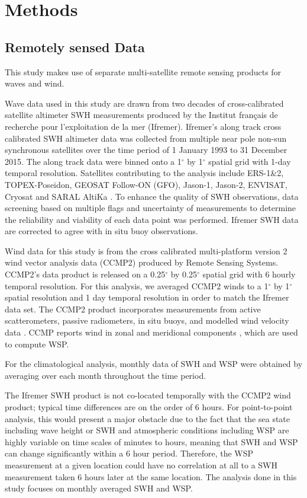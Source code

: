 \documentclass[draft,linenumbers]{agujournal2018}
\begin{document}
\section{Methods}

\subsection{Remotely sensed Data}

This study makes use of separate multi-satellite remote sensing products for waves and wind.   

Wave data used in this study are drawn from two decades of cross-calibrated satellite altimeter SWH measurements produced by the Institut fran\c{c}ais de recherche pour l'exploitation de la mer (Ifremer).  Ifremer's along track cross calibrated SWH altimeter data was collected from multiple near pole non-sun synchronous satellites over the time period of 1 January 1993 to 31 December 2015. The along track data were binned onto a 1$^{\circ}$ by 1$^{\circ}$ spatial grid with 1-day temporal resolution. Satellites contributing to the analysis include ERS-1\&2, TOPEX-Poseidon, GEOSAT Follow-ON (GFO), Jason-1, Jason-2, ENVISAT, Cryosat and SARAL AltiKa \cite{Queffeulou2017Global}. To enhance the quality of SWH observations, data screening based on multiple flags and uncertainty of measurements to determine the reliability and viability of each data point was performed. Ifremer SWH data are corrected to agree with in situ buoy observations.

Wind data for this study is from the cross calibrated multi-platform version 2 wind vector analysis data (CCMP2) produced by Remote Sensing Systems. CCMP2's data product is released on a 0.25$^{\circ}$ by 0.25$^{\circ}$ spatial grid with 6 hourly temporal resolution. For this analysis, we averaged CCMP2 winds to a 1$^{\circ}$ by 1$^{\circ}$ spatial resolution and 1 day temporal resolution in order to match the Ifremer data set. The CCMP2 product incorporates measurements from active scatterometers, passive radiometers, in situ buoys, and modelled wind velocity data \cite{Atlas2011Remote}. CCMP reports wind in zonal and meridional components \cite{Atlas2011Remote}, which are used to compute WSP. 

For the climatological analysis, monthly data of SWH and WSP were obtained by averaging over each month throughout the time period.  

The Ifremer SWH product is not co-located temporally with the CCMP2 wind product; typical time differences are on the order of 6 hours. For point-to-point analysis, this would present a major obstacle due to the fact that the sea state including wave height or SWH and atmospheric conditions including WSP are highly variable on time scales of minutes to hours, meaning that SWH and WSP can change significantly within a 6 hour period. Therefore, the WSP measurement at a given location could have no correlation at all to a SWH measurement taken 6 hours later at the same location. The analysis done in this study focuses on monthly averaged SWH and WSP.
\end{document}
